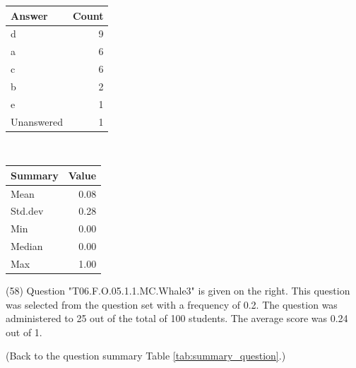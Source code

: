 \documentclass[12pt,nohyper]{tufte-handout}\usepackage[]{graphicx}\usepackage[]{color}
\begin{document}
\begin{center}%
\begin{tabular}{lr}
  \hline
Answer & Count \\ 
  \hline
d &   9 \\ 
  a &   6 \\ 
  c &   6 \\ 
  b &   2 \\ 
  e &   1 \\ 
  Unanswered &   1 \\ 
   \hline
\end{tabular}
~~~~~~~~%
\begin{tabular}{lr}
  \hline
Summary & Value \\ 
  \hline
Mean & 0.08 \\ 
  Std.dev & 0.28 \\ 
  Min & 0.00 \\ 
  Median & 0.00 \\ 
  Max & 1.00 \\ 
   \hline
\end{tabular}
\end{center}\newpage{} (58) Question "T06.F.O.05.1.1.MC.Whale3" is given on the right. This question was selected from the question set with a frequency of 0.2. The question was administered to 25 out of the total of 100 students. The average score was 0.24 out of 1.

 (Back to the question summary Table \ref{tab:summary_question}.)
\end{document}
